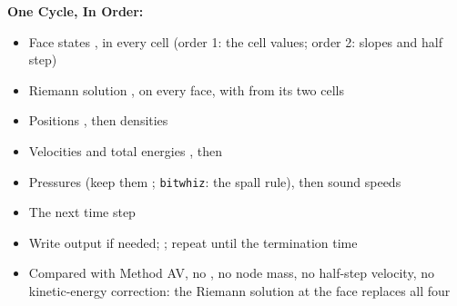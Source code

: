 \documentclass[11pt,addpoints]{exam}
\begin{document}
\begin{tcolorbox}[breakable]
\textbf{One Cycle, In Order:}\vspace{.5em}
\begin{itemize}
\item[a.] Face states ,  in every cell (order 1: the cell values; order 2: slopes and half step)
\item[b.] Riemann solution ,  on every face, with  from its two cells
\item[c.] Positions , then densities 
\item[d.] Velocities  and total energies , then 
\item[e.] Pressures  (keep them ; \texttt{bitwhiz}: the spall rule), then sound speeds 
\item[f.] The next time step 
\item[g.] Write output if needed; ; repeat until the termination time\vspace{.5em}
\item Compared with Method AV, \hspace{3mm} no , no node mass, no half-step velocity, no kinetic-energy correction: the Riemann solution at the face replaces all four
\end{itemize}
\end{tcolorbox}

\;\\
\end{document}
